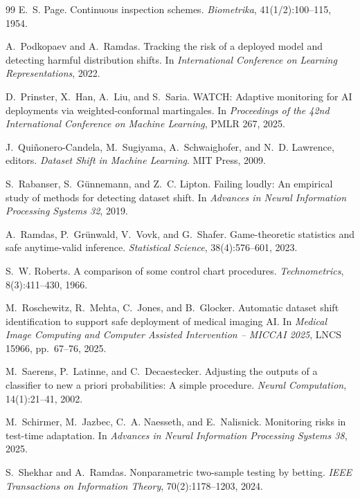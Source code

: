 \begin{thebibliography}{99}
E.~S. Page.
Continuous inspection schemes.
\textit{Biometrika}, 41(1/2):100--115, 1954.

A.~Podkopaev and A.~Ramdas.
Tracking the risk of a deployed model and detecting harmful distribution shifts.
In \textit{International Conference on Learning Representations}, 2022.

D.~Prinster, X.~Han, A.~Liu, and S.~Saria.
WATCH: Adaptive monitoring for AI deployments via weighted-conformal martingales.
In \textit{Proceedings of the 42nd International Conference on Machine Learning}, PMLR 267, 2025.

J.~Qui\~nonero-Candela, M.~Sugiyama, A.~Schwaighofer, and N.~D. Lawrence, editors.
\textit{Dataset Shift in Machine Learning}.
MIT Press, 2009.

S.~Rabanser, S.~G\"unnemann, and Z.~C. Lipton.
Failing loudly: An empirical study of methods for detecting dataset shift.
In \textit{Advances in Neural Information Processing Systems 32}, 2019.

A.~Ramdas, P.~Gr\"unwald, V.~Vovk, and G.~Shafer.
Game-theoretic statistics and safe anytime-valid inference.
\textit{Statistical Science}, 38(4):576--601, 2023.

S.~W. Roberts.
A comparison of some control chart procedures.
\textit{Technometrics}, 8(3):411--430, 1966.

M.~Roschewitz, R.~Mehta, C.~Jones, and B.~Glocker.
Automatic dataset shift identification to support safe deployment of medical imaging AI.
In \textit{Medical Image Computing and Computer Assisted Intervention -- MICCAI 2025}, LNCS 15966, pp.~67--76, 2025.

M.~Saerens, P.~Latinne, and C.~Decaestecker.
Adjusting the outputs of a classifier to new a priori probabilities: A simple procedure.
\textit{Neural Computation}, 14(1):21--41, 2002.

M.~Schirmer, M.~Jazbec, C.~A. Naesseth, and E.~Nalisnick.
Monitoring risks in test-time adaptation.
In \textit{Advances in Neural Information Processing Systems 38}, 2025.

S.~Shekhar and A.~Ramdas.
Nonparametric two-sample testing by betting.
\textit{IEEE Transactions on Information Theory}, 70(2):1178--1203, 2024.


\end{thebibliography}
